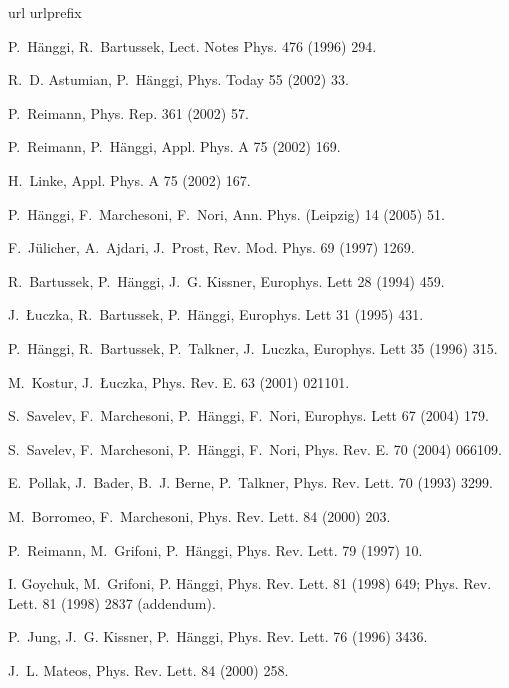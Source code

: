 \documentclass{elsart}
\begin{document}
\begin{thebibliography}{99}
\expandafter\ifx\csname url\endcsname\relax
  \def\url#1{\texttt{#1}}\fi
\expandafter\ifx\csname urlprefix\endcsname\relax\def\urlprefix{URL }\fi

P.~H\"anggi, R.~Bartussek, Lect. Notes Phys. 476 (1996) 294.

R.~D. Astumian, P.~H\"anggi, Phys. Today 55 (2002) 33.

P.~Reimann, Phys. Rep. 361 (2002) 57.

P.~Reimann, P.~H\"anggi, Appl. Phys. A 75 (2002) 169.

H.~Linke, Appl. Phys. A 75 (2002) 167.

P.~H\"anggi, F.~Marchesoni, F.~Nori, Ann. Phys. (Leipzig) 14 (2005)
51.

F.~J\"ulicher, A.~Ajdari, J.~Prost, Rev. Mod. Phys. 69 (1997) 1269.

R.~Bartussek, P.~H\"anggi, J.~G. Kissner, Europhys. Lett 28 (1994) 459.

J.~{\L}uczka, R.~Bartussek, P.~H\"anggi, Europhys. Lett 31 (1995) 431.

P.~H\"anggi, R.~Bartussek, P.~Talkner, J.~Luczka, Europhys. Lett 35 (1996) 315.

M.~Kostur, J.~{\L}uczka, Phys. Rev. E. 63 (2001) 021101.

S.~Savelev, F.~Marchesoni, P.~H\"anggi, F.~Nori, Europhys. Lett 67 (2004) 179.

S.~Savelev, F.~Marchesoni, P.~H\"anggi, F.~Nori, Phys. Rev. E. 70 (2004)
  066109.

E.~Pollak, J.~Bader, B.~J. Berne, P.~Talkner, Phys. Rev. Lett. 70 (1993) 3299.

M.~Borromeo, F.~Marchesoni, Phys. Rev. Lett. 84 (2000) 203.

P.~Reimann, M.~Grifoni, P.~H\"anggi, Phys. Rev. Lett.  79 (1997) 10.

I. Goychuk, M.~Grifoni,  P. H\"anggi, Phys. Rev. Lett. 81 (1998)
649;  Phys. Rev. Lett.  81 (1998) 2837 (addendum).

P.~Jung, J.~G. Kissner, P.~H\"anggi, Phys. Rev. Lett. 76 (1996) 3436.

J.~L. Mateos, Phys. Rev. Lett. 84 (2000) 258.



\end{thebibliography}
\end{document}
